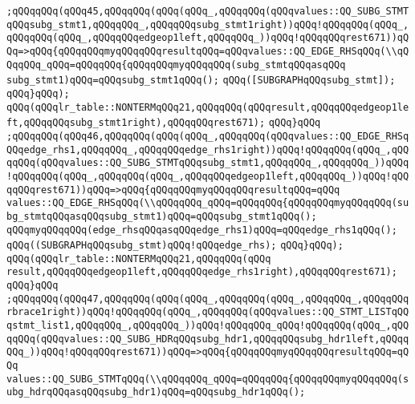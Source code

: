 \verb|;qQQqqQQq(qQQq45,qQQqqQQq(qQQq(qQQq_,qQQqqQQq(qQQqvalues::QQ_SUBG_STMTqQQqsubg_stmt1,qQQqqQQq_,qQQqqQQqsubg_stmt1right))qQQq!qQQqqQQq(qQQq_,qQQqqQQq(qQQq_,qQQqqQQqedgeop1left,qQQqqQQq_))qQQq!qQQqqQQqrest671))qQQq=>qQQq{qQQqqQQqmyqQQqqQQqresultqQQq=qQQqvalues::QQ_EDGE_RHSqQQq(\\qQQqqQQq_qQQq=qQQqqQQq{qQQqqQQqmyqQQqqQQq(subg_stmtqQQqasqQQq|\newline
\verb|subg_stmt1)qQQq=qQQqsubg_stmt1qQQq();|\newline
\verb|qQQq([SUBGRAPHqQQqsubg_stmt]);|\newline
\verb|qQQq}qQQq);|\newline
\verb|qQQq(qQQqlr_table::NONTERMqQQq21,qQQqqQQq(qQQqresult,qQQqqQQqedgeop1left,qQQqqQQqsubg_stmt1right),qQQqqQQqrest671);|\newline
\verb|qQQq}qQQq|\newline
\verb|;qQQqqQQq(qQQq46,qQQqqQQq(qQQq(qQQq_,qQQqqQQq(qQQqvalues::QQ_EDGE_RHSqQQqedge_rhs1,qQQqqQQq_,qQQqqQQqedge_rhs1right))qQQq!qQQqqQQq(qQQq_,qQQqqQQq(qQQqvalues::QQ_SUBG_STMTqQQqsubg_stmt1,qQQqqQQq_,qQQqqQQq_))qQQq!qQQqqQQq(qQQq_,qQQqqQQq(qQQq_,qQQqqQQqedgeop1left,qQQqqQQq_))qQQq!qQQqqQQqrest671))qQQq=>qQQq{qQQqqQQqmyqQQqqQQqresultqQQq=qQQq|\newline
\verb|values::QQ_EDGE_RHSqQQq(\\qQQqqQQq_qQQq=qQQqqQQq{qQQqqQQqmyqQQqqQQq(subg_stmtqQQqasqQQqsubg_stmt1)qQQq=qQQqsubg_stmt1qQQq();|\newline
\verb|qQQqmyqQQqqQQq(edge_rhsqQQqasqQQqedge_rhs1)qQQq=qQQqedge_rhs1qQQq();|\newline
\verb|qQQq((SUBGRAPHqQQqsubg_stmt)qQQq!qQQqedge_rhs);|\newline
\verb|qQQq}qQQq);|\newline
\verb|qQQq(qQQqlr_table::NONTERMqQQq21,qQQqqQQq(qQQq|\newline
\verb|result,qQQqqQQqedgeop1left,qQQqqQQqedge_rhs1right),qQQqqQQqrest671);|\newline
\verb|qQQq}qQQq|\newline
\verb|;qQQqqQQq(qQQq47,qQQqqQQq(qQQq(qQQq_,qQQqqQQq(qQQq_,qQQqqQQq_,qQQqqQQqrbrace1right))qQQq!qQQqqQQq(qQQq_,qQQqqQQq(qQQqvalues::QQ_STMT_LISTqQQqstmt_list1,qQQqqQQq_,qQQqqQQq_))qQQq!qQQqqQQq_qQQq!qQQqqQQq(qQQq_,qQQqqQQq(qQQqvalues::QQ_SUBG_HDRqQQqsubg_hdr1,qQQqqQQqsubg_hdr1left,qQQqqQQq_))qQQq!qQQqqQQqrest671))qQQq=>qQQq{qQQqqQQqmyqQQqqQQqresultqQQq=qQQq|\newline
\verb|values::QQ_SUBG_STMTqQQq(\\qQQqqQQq_qQQq=qQQqqQQq{qQQqqQQqmyqQQqqQQq(subg_hdrqQQqasqQQqsubg_hdr1)qQQq=qQQqsubg_hdr1qQQq();|\newline
